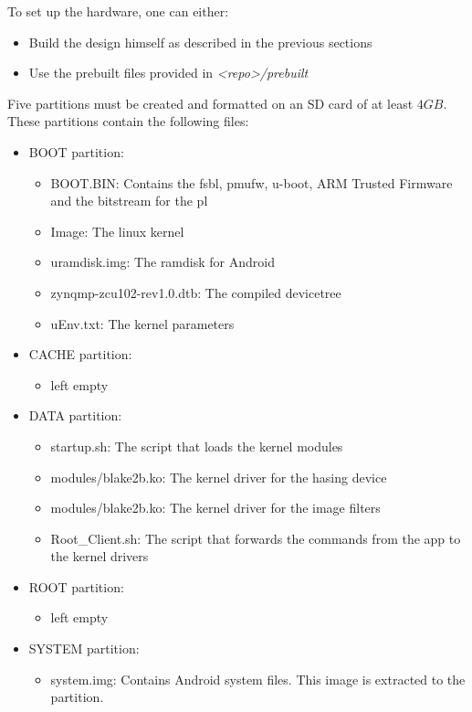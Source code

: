 To set up the hardware, one can either:
\begin{itemize}
	\item Build the design himself as described in the previous sections
	\item Use the prebuilt files provided in \emph{<repo>/prebuilt}
\end{itemize}

Five partitions must be created and formatted on an SD card of at least $4GB$. These partitions contain the following files:
\begin{itemize}
    \item BOOT partition:
    \begin{itemize}
        \item BOOT.BIN: Contains the \gls{fsbl}, \gls{pmufw}, u-boot, ARM Trusted Firmware and the bitstream for the \gls{pl}
        \item Image: The linux kernel
        \item uramdisk.img: The ramdisk for Android
        \item zynqmp-zcu102-rev1.0.dtb: The compiled devicetree
        \item uEnv.txt: The kernel parameters 
    \end{itemize}
    
    \item CACHE partition:
    \begin{itemize}
        \item left empty
    \end{itemize}
    
    \item DATA partition:
    \begin{itemize}
        \item startup.sh: The script that loads the kernel modules
        \item modules/blake2b.ko: The kernel driver for the hasing device
        \item modules/blake2b.ko: The kernel driver for the image filters
        \item Root\_Client.sh: The script that forwards the commands from the app to the kernel drivers
    \end{itemize}
    
    \item ROOT partition:
    \begin{itemize}
        \item left empty
    \end{itemize}
    
    \item SYSTEM partition:
    \begin{itemize}
        \item system.img: Contains Android system files. This image is extracted to the partition. 
    \end{itemize}
\end{itemize}

